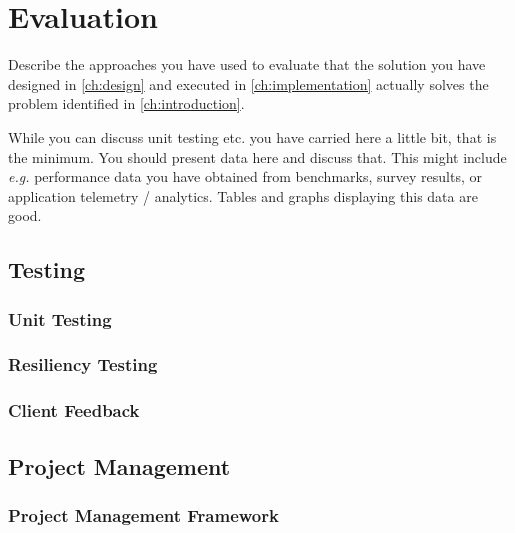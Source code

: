 \chapter{Evaluation}
\label{ch:evaluation}

Describe the approaches you have used to evaluate that the solution you have designed in \ref{ch:design} and executed in \ref{ch:implementation} actually solves the problem identified in \ref{ch:introduction}.

While you can discuss unit testing etc. you have carried here a little bit, that is the minimum. You should present data here and discuss that. This might include \emph{e.g.} performance data you have obtained from benchmarks, survey results, or application telemetry / analytics. Tables and graphs displaying this data are good.


\section{Testing}
\label{se:testing}

\subsection{Unit Testing}
\label{sse:unittesting}

\subsection{Resiliency Testing}
\label{sse:resiliencytesting}

\subsection{Client Feedback}
\label{se:clientfeedback}

\section{Project Management}
\label{se:projectmanagement}

\subsection{Project Management Framework}
\label{sse:pmframework}

